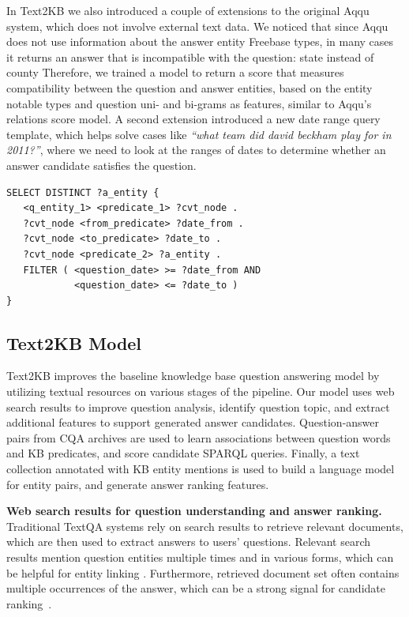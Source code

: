 In Text2KB we also introduced a couple of extensions to the original Aqqu system, which does not involve external text data.
We noticed that since Aqqu does not use information about the answer entity Freebase types, in many cases it returns an answer that is incompatible with the question: \eg state instead of county \etc
Therefore, we trained a model to return a score that measures compatibility between the question and answer entities, based on the entity notable types and question uni- and bi-grams as features, similar to Aqqu's relations score model.
A second extension introduced a new date range query template, which helps solve cases like \textit{``what team did david beckham play for in 2011?''}, where we need to look at the ranges of dates to determine whether an answer candidate satisfies the question.
\\

\begin{minipage}{\linewidth}
\begin{lstlisting}[frame=single,basicstyle=\small]
SELECT DISTINCT ?a_entity {
   <q_entity_1> <predicate_1> ?cvt_node .
   ?cvt_node <from_predicate> ?date_from .
   ?cvt_node <to_predicate> ?date_to .
   ?cvt_node <predicate_2> ?a_entity .
   FILTER ( <question_date> >= ?date_from AND
            <question_date> <= ?date_to )
}
\end{lstlisting}
\end{minipage}


\subsection{Text2KB Model}
\label{section:factoid:text2kb:model}

Text2KB improves the baseline knowledge base question answering model by utilizing textual resources on various stages of the pipeline.
Our model uses web search results to improve question analysis, \ie identify question topic, and extract additional features to support generated answer candidates.
Question-answer pairs from CQA archives are used to learn associations between question words and KB predicates, and score candidate SPARQL queries.
Finally, a text collection annotated with KB entity mentions is used to build a language model for entity pairs, and generate answer ranking features.

\textbf{Web search results for question understanding and answer ranking.}
Traditional TextQA systems rely on search results to retrieve relevant documents, which are then used to extract answers to users' questions.
Relevant search results mention question entities multiple times and in various forms, which can be helpful for entity linking \cite{SMAPH_ERD:2014}.
Furthermore, retrieved document set often contains multiple occurrences of the answer, which can be a strong signal for candidate ranking~\cite{lin2007exploration}.

